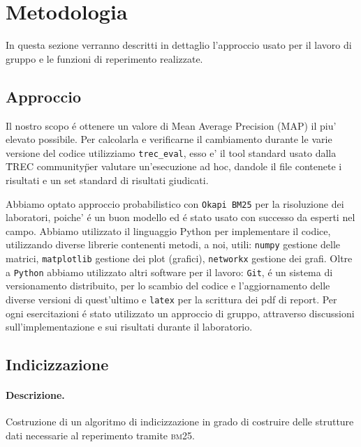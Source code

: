 \section{Metodologia}
\label{sec:metodologia}

In questa sezione verranno descritti in dettaglio l'approccio usato per il lavoro di gruppo e le funzioni di reperimento realizzate.


\subsection{Approccio}
\label{sec:approccio}

Il nostro scopo \'e ottenere un valore di Mean Average Precision (\textsc{MAP}) il piu' elevato possibile. Per calcolarla e verificarne il cambiamento durante le varie versione del codice utilizziamo \texttt{trec\_eval}, esso e' il tool standard usato dalla \"TREC community\" per valutare un'esecuzione ad hoc, dandole il file contenete i risultati e un set standard di risultati giudicati.  

Abbiamo optato approccio probabilistico con \texttt{Okapi BM25} per la risoluzione dei laboratori, poiche' \'e un buon modello ed \'e stato usato con successo da esperti nel campo.  
Abbiamo utilizzato il linguaggio Python per implementare il codice, utilizzando diverse librerie contenenti metodi, a noi, utili: \texttt{numpy} gestione delle matrici, \texttt{matplotlib} gestione dei plot (grafici), \texttt{networkx} gestione dei grafi.
Oltre a \texttt{Python} abbiamo utilizzato altri software per il lavoro: \texttt{Git}, \'e un sistema di versionamento distribuito, per lo scambio del codice e l'aggiornamento delle diverse versioni di quest'ultimo e \texttt{latex} per la scrittura dei pdf di report.
Per ogni esercitazioni \'e stato utilizzato un approccio di gruppo, attraverso discussioni sull'implementazione e sui risultati durante il laboratorio.

\subsection{Indicizzazione} \label{sec:metodi-di-indic}

\paragraph{\textbf{Descrizione.}} Costruzione di un algoritmo di indicizzazione in grado di costruire delle strutture dati necessarie al reperimento tramite \textsc{bm25}. 

